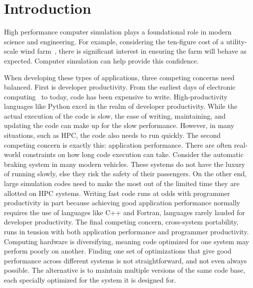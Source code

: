 \chapter{Introduction}

High performance computer simulation plays a foundational role in modern science and engineering.
For example, considering the ten-figure cost of a utility-scale wind farm~\cite{farmCost}, there is significant interest in ensuring the farm will behave as expected. 
Computer simulation can help provide this confidence.

When developing these types of applications, three competing concerns need balanced. 
First is developer productivity.
From the earliest days of electronic computing~\cite{backus1957fortran} to today, code has been expensive to write.
High-productivity languages like Python excel in the realm of developer productivity.
While the actual execution of the code is slow, the ease of writing, maintaining, and updating the code can make up for the slow performance.
However, in many situations, such as HPC, the code also needs to run quickly.
The second competing concern is exactly this: application performance.
There are often real-world constraints on how long code execution can take.
Consider the automatic braking system in many modern vehicles.
These systems do not have the luxury of running slowly, else they risk the safety of their passengers.
On the other end, large simulation codes need to make the most out of the limited time they are allotted on HPC systems.
Writing fast code runs at odds with programmer productivity in part because achieving good application performance normally requires the use of languages like C++ and Fortran, languages rarely lauded for developer productivity.
The final competing concern, cross-system portability, runs in tension with both application performance and programmer productivity.
Computing hardware is diversifying, meaning code optimized for one system may perform poorly on another.
Finding one set of optimizations that give good performance across different systems is not straightforward, and not even always possible.
The alternative is to maintain multiple versions of the same code base, each specially optimized for the system it is designed for.

